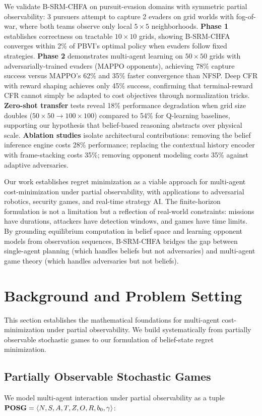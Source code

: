 \documentclass{article}
\begin{document}
We validate B-SRM-CHFA on pursuit-evasion domains with symmetric partial observability: 3 pursuers attempt to capture 2 evaders on grid worlds with fog-of-war, where both teams observe only local $5 \times 5$ neighborhoods. \textbf{Phase 1} establishes correctness on tractable $10 \times 10$ grids, showing B-SRM-CHFA converges within 2\% of PBVI's optimal policy when evaders follow fixed strategies. \textbf{Phase 2} demonstrates multi-agent learning on $50 \times 50$ grids with adversarially-trained evaders (MAPPO opponents), achieving 78\% capture success versus MAPPO's 62\% and 35\% faster convergence than NFSP. Deep CFR with reward shaping achieves only 45\% success, confirming that terminal-reward CFR cannot simply be adapted to cost objectives through normalization tricks. \textbf{Zero-shot transfer} tests reveal 18\% performance degradation when grid size doubles ($50 \times 50 \to 100 \times 100$) compared to 54\% for Q-learning baselines, supporting our hypothesis that belief-based reasoning abstracts over physical scale. \textbf{Ablation studies} isolate architectural contributions: removing the belief inference engine costs 28\% performance; replacing the contextual history encoder with frame-stacking costs 35\%; removing opponent modeling costs 35\% against adaptive adversaries.

Our work establishes regret minimization as a viable approach for multi-agent cost-minimization under partial observability, with applications to adversarial robotics, security games, and real-time strategy AI. The finite-horizon formulation is not a limitation but a reflection of real-world constraints: missions have durations, attackers have detection windows, and games have time limits. By grounding equilibrium computation in belief space and learning opponent models from observation sequences, B-SRM-CHFA bridges the gap between single-agent planning (which handles beliefs but not adversaries) and multi-agent game theory (which handles adversaries but not beliefs).

\section{Background and Problem Setting}

This section establishes the mathematical foundations for multi-agent cost-minimization under partial observability. We build systematically from partially observable stochastic games to our formulation of belief-state regret minimization.
\subsection{Partially Observable Stochastic Games}
We model multi-agent interaction under partial observability as a tuple $\text{\textbf{POSG}} = \langle N, S, A, T, Z, O, R, b_0, \gamma \rangle$:
\end{document}
